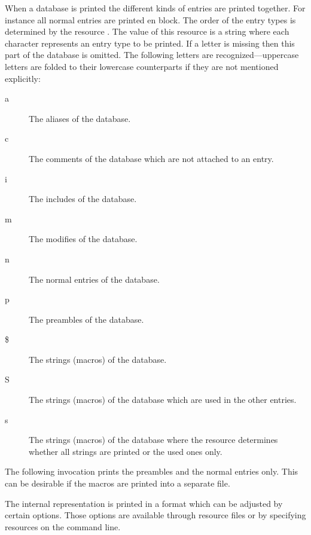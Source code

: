 \documentclass[11pt,a4paper]{scrbook}
\begin{document}
When a database is printed the different kinds of entries are printed
together. For instance all normal entries are printed en block. The order of
the entry types is determined by the resource . The
value of this resource is a string where each character represents an entry
type to be printed. If a letter is missing then this part of the database is
omitted. The following letters are recognized---uppercase letters are folded
to their lowercase counterparts if they are not mentioned explicitly:
\begin{description}
\item [a] The aliases of the database.
\item [c] The comments of the database which are not attached to an entry.
\item [i] The includes of the database.
\item [m] The modifies of the database.
\item [n] The normal entries of the database.
\item [p] The preambles of the database.
\item [\$] The strings (macros) of the database.
\item [S] The strings (macros) of the database which are used in the other
  entries.
\item [s] The strings (macros) of the database where the resource
   determines whether all strings are printed or the
  used ones only.
\end{description}

The following invocation prints the preambles and the normal entries only.
This can be desirable if the macros are printed into a separate file.

\begin{Resources}
\end{Resources}

The internal representation is printed in a format which can be adjusted by
certain options. Those options are available through resource files or
by specifying resources on the command line.
\end{document}
